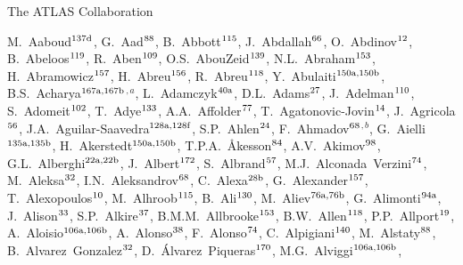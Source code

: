 \begin{flushleft}
{\Large The ATLAS Collaboration}

\bigskip

M.~Aaboud$^\textrm{\scriptsize 137d}$,
G.~Aad$^\textrm{\scriptsize 88}$,
B.~Abbott$^\textrm{\scriptsize 115}$,
J.~Abdallah$^\textrm{\scriptsize 66}$,
O.~Abdinov$^\textrm{\scriptsize 12}$,
B.~Abeloos$^\textrm{\scriptsize 119}$,
R.~Aben$^\textrm{\scriptsize 109}$,
O.S.~AbouZeid$^\textrm{\scriptsize 139}$,
N.L.~Abraham$^\textrm{\scriptsize 153}$,
H.~Abramowicz$^\textrm{\scriptsize 157}$,
H.~Abreu$^\textrm{\scriptsize 156}$,
R.~Abreu$^\textrm{\scriptsize 118}$,
Y.~Abulaiti$^\textrm{\scriptsize 150a,150b}$,
B.S.~Acharya$^\textrm{\scriptsize 167a,167b}$$^{,a}$,
L.~Adamczyk$^\textrm{\scriptsize 40a}$,
D.L.~Adams$^\textrm{\scriptsize 27}$,
J.~Adelman$^\textrm{\scriptsize 110}$,
S.~Adomeit$^\textrm{\scriptsize 102}$,
T.~Adye$^\textrm{\scriptsize 133}$,
A.A.~Affolder$^\textrm{\scriptsize 77}$,
T.~Agatonovic-Jovin$^\textrm{\scriptsize 14}$,
J.~Agricola$^\textrm{\scriptsize 56}$,
J.A.~Aguilar-Saavedra$^\textrm{\scriptsize 128a,128f}$,
S.P.~Ahlen$^\textrm{\scriptsize 24}$,
F.~Ahmadov$^\textrm{\scriptsize 68}$$^{,b}$,
G.~Aielli$^\textrm{\scriptsize 135a,135b}$,
H.~Akerstedt$^\textrm{\scriptsize 150a,150b}$,
T.P.A.~{\AA}kesson$^\textrm{\scriptsize 84}$,
A.V.~Akimov$^\textrm{\scriptsize 98}$,
G.L.~Alberghi$^\textrm{\scriptsize 22a,22b}$,
J.~Albert$^\textrm{\scriptsize 172}$,
S.~Albrand$^\textrm{\scriptsize 57}$,
M.J.~Alconada~Verzini$^\textrm{\scriptsize 74}$,
M.~Aleksa$^\textrm{\scriptsize 32}$,
I.N.~Aleksandrov$^\textrm{\scriptsize 68}$,
C.~Alexa$^\textrm{\scriptsize 28b}$,
G.~Alexander$^\textrm{\scriptsize 157}$,
T.~Alexopoulos$^\textrm{\scriptsize 10}$,
M.~Alhroob$^\textrm{\scriptsize 115}$,
B.~Ali$^\textrm{\scriptsize 130}$,
M.~Aliev$^\textrm{\scriptsize 76a,76b}$,
G.~Alimonti$^\textrm{\scriptsize 94a}$,
J.~Alison$^\textrm{\scriptsize 33}$,
S.P.~Alkire$^\textrm{\scriptsize 37}$,
B.M.M.~Allbrooke$^\textrm{\scriptsize 153}$,
B.W.~Allen$^\textrm{\scriptsize 118}$,
P.P.~Allport$^\textrm{\scriptsize 19}$,
A.~Aloisio$^\textrm{\scriptsize 106a,106b}$,
A.~Alonso$^\textrm{\scriptsize 38}$,
F.~Alonso$^\textrm{\scriptsize 74}$,
C.~Alpigiani$^\textrm{\scriptsize 140}$,
M.~Alstaty$^\textrm{\scriptsize 88}$,
B.~Alvarez~Gonzalez$^\textrm{\scriptsize 32}$,
D.~\'{A}lvarez~Piqueras$^\textrm{\scriptsize 170}$,
M.G.~Alviggi$^\textrm{\scriptsize 106a,106b}$,

\end{flushleft}
